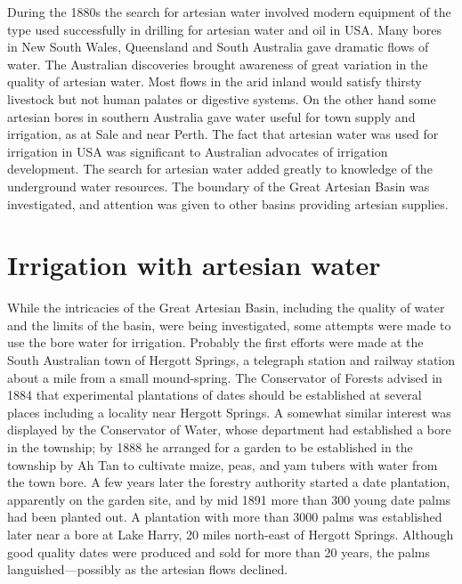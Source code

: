 During the 1880s the search for artesian water involved modern
equipment of the type used successfully in drilling for artesian water
and oil in USA.  Many bores in New South Wales, Queensland and South
Australia gave dramatic flows of water.  The Australian discoveries
brought awareness of great variation in the quality of artesian water.
Most flows in the arid inland would satisfy thirsty livestock but not
human palates or digestive systems.  On the other hand some artesian
bores in southern Australia gave water useful for town supply and
irrigation, as at Sale and near Perth.  The fact that artesian water
was used for irrigation in USA  was significant to
Australian advocates of irrigation development.  The search for
artesian water added greatly to knowledge of the underground water
resources.  The boundary of the Great Artesian Basin was investigated,
and attention was given to other basins providing artesian
supplies.

\section*{Irrigation with artesian water}

While the intricacies of the Great Artesian Basin, including the
quality of water and the limits of the basin, were being investigated,
some attempts were made to use the bore water for irrigation.
Probably the first efforts were made at the South Australian town of
Hergott Springs,  a telegraph station and
railway station about a mile from a small mound-spring.
 The Conservator of Forests advised in 1884 that
 experimental plantations of dates should be established at several
places including a locality near Hergott Springs.  A somewhat similar
interest was displayed by the Conservator of Water, whose department
had established a bore in the township; by 1888 he arranged for a
garden to be established in the township by Ah Tan  to
cultivate maize, peas, and yam tubers with water from the town bore.
A few years later the forestry authority started a date plantation,
apparently on the garden site, and by mid 1891 more than 300 young
date palms had been planted out.  A plantation with more than 3000
palms was established later near a bore at Lake Harry,
 20 miles north-east of Hergott Springs. Although
good quality dates were produced and sold for more than 20 years, the
palms languished---possibly as the artesian flows
declined.

